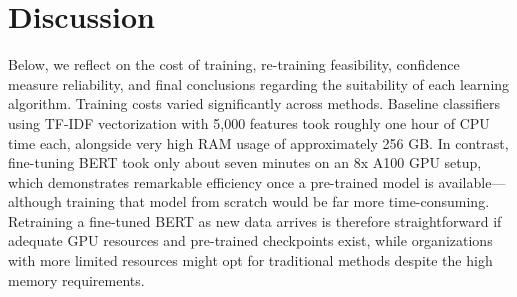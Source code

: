 \section{Discussion}\label{sec:discussion}

Below, we reflect on the cost of training, re-training feasibility, confidence measure reliability, and final conclusions regarding the suitability of each learning algorithm. Training costs varied significantly across methods. Baseline classifiers using TF-IDF vectorization with 5,000 features took roughly one hour of CPU time each, alongside very high RAM usage of approximately 256 GB. In contrast, fine-tuning BERT took only about seven minutes on an 8x A100 GPU setup, which demonstrates remarkable efficiency once a pre-trained model is available—although training that model from scratch would be far more time-consuming. Retraining a fine-tuned BERT as new data arrives is therefore straightforward if adequate GPU resources and pre-trained checkpoints exist, while organizations with more limited resources might opt for traditional methods despite the high memory requirements.

